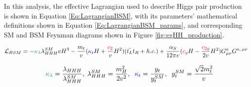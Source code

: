 In this analysis, the effective Lagrangian \cite{deFlorian:2016spz, Carvalho:2015ttv} used to describe Higgs pair production is shown in Equation \ref{Eq:LagrangianBSM}, with its parameters' mathematical definitions shown in Equation \ref{Eq:LagrangianBSM_params}, and corresponding SM and BSM Feynman diagrams shown in Figure \ref{fig:ggHH_production}.

\begin{equation} \label{Eq:LagrangianBSM}
    \mathcal{L}_{BSM} = -{\textcolor{ForestGreen}{\kappa_{\lambda}}} \lambda^{SM}_{HHH} v H^3 -
      \frac{m_t}{v}({\textcolor{blue}{\kappa_t}} H + \frac{\textcolor{red}{c_2}}{v} H^2)(\bar{t_L}t_R + h.c.)
      + \frac{\alpha_S}{12 \pi v}(\textcolor{red}{c_g} H
      - \frac{\textcolor{red}{c_{2g}}}{2 v}H^2)G^a_{\mu \nu}G^{a, \, \mu \nu}
\end{equation}

\begin{eqnarray}\label{Eq:LagrangianBSM_params}
    &&{\textcolor{ForestGreen}{\kappa_{\lambda}}} = \frac{\lambda_{HHH}}{\lambda_{HHH}^{SM}}, \;
    \lambda_{HHH}^{SM} = \frac{ m^2_{H}}{2v^2}, \;\;
    {\textcolor{blue}{\kappa_{t}}} = \frac{ y_{t}}{y_{t}^{SM}}, \;\;
    y_{t}^{SM} = \frac{\sqrt{2} m^2_{t}}{ v}
\end{eqnarray}

